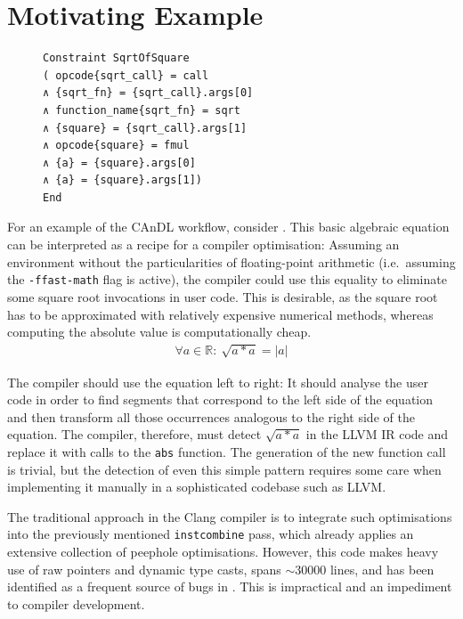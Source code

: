 \section{Motivating Example}

\begin{figure}[b]
\centering
\begin{minipage}[t]{0.67\textwidth}
\begin{lstlisting}[language=CAnDL,label={fig:candlspec},caption=
   {The left side of \Cref{fig:root} as specified in CAnDL\parfillskip=0pt}]
Constraint SqrtOfSquare
( opcode{sqrt_call} = call
∧ {sqrt_fn} = {sqrt_call}.args[0]
∧ function_name{sqrt_fn} = sqrt
∧ {square} = {sqrt_call}.args[1]
∧ opcode{square} = fmul
∧ {a} = {square}.args[0]
∧ {a} = {square}.args[1])
End
\end{lstlisting}
\end{minipage}
\end{figure}

    For an example of the CAnDL workflow, consider .
    This basic algebraic equation can be interpreted as a recipe for a compiler
    optimisation:
    Assuming an environment without the particularities of floating-point
    arithmetic (i.e.\ assuming the \texttt{-ffast-math} flag is active), the
    compiler could use this equality to eliminate some square root invocations
    in user code.
    This is desirable, as the square root has to be approximated with relatively
    expensive numerical methods, whereas computing the absolute value is
    computationally cheap.
    \begin{align}
    \label{fig:root}
    \forall a\in \mathbb{R}\colon\ \sqrt{a*a}=|a|
    \end{align}

    The compiler should use the equation left to right:
    It should analyse the user code in order to find segments that correspond to
    the left side of the equation and then transform all those occurrences
    analogous to the right side of the equation.
    The compiler, therefore, must detect $\sqrt{a*a}$ in the LLVM IR code and
    replace it with calls to the \texttt{abs} function.
    The generation of the new function call is trivial, but the detection of
    even this simple pattern requires some care when implementing it manually in
    a sophisticated codebase such as LLVM.

    The traditional approach in the Clang compiler is to integrate such
    optimisations into the previously mentioned \texttt{instcombine} pass, which
    already applies an extensive collection of peephole optimisations.
    However, this code makes heavy use of raw pointers and dynamic type casts,
    spans $\sim30000$ lines, and has been identified as a frequent source of
    bugs in
    \citet{Menendez:2017:ADP:3062341.3062372,Yang:2011:FUB:1993316.1993532}.
    This is impractical and an impediment to compiler development.

